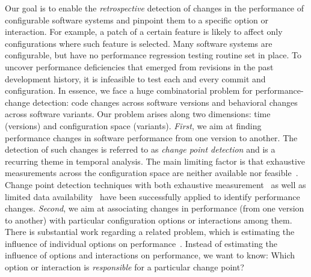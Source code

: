 \documentclass[sigconf]{acmart}
\begin{document}
	Our goal is to enable the \emph{retrospective} detection of changes in the performance of configurable software systems and pinpoint them to a specific option or interaction. For example, a patch of a certain feature is likely to affect only configurations where such feature is selected. Many software systems are configurable, but have no performance regression testing routine set in place. To uncover performance deficiencies that emerged from revisions in the past development history, it is infeasible to test each and every commit and configuration. In essence, we face a huge combinatorial problem for performance-change detection: code changes across software versions and behavioral changes across software variants.
	Our problem arises along two dimensions: time (versions) and configuration space (variants).
	\emph{First}, we aim at finding performance changes in software performance from one version to another.
	The detection of such changes is referred to as \emph{change point detection} and is a recurring theme in temporal analysis.
	The main limiting factor is that exhaustive measurements across the configuration space are neither available nor feasible~\cite{white_selecting_2009}.
	Change point detection techniques with both exhaustive measurement~\cite{cityIdentifying2014,daly_industry_2020} as well as limited data availability~\cite{sandoval_alcocer_learning_2016,alcocer_prioritizing_2020,huang_performance_2014,muhlbauer_accurate_2019} have been successfully applied to identify performance changes.
	\emph{Second}, we aim at associating changes in performance (from one version to another) with particular configuration options or interactions among them.
	There is substantial work  regarding a related problem, which is estimating the influence of individual options on performance~\cite{siegmundPredictingPerformanceAutomated2012,siegmundPerformanceinfluenceModelsHighly2015,sarkarCostEfficientSamplingPerformance,haDeepPerf2019}. Instead of estimating the influence of options and interactions on performance, we want to know: Which option or interaction is \emph{responsible} for a particular change point?
	
	
\end{document}
